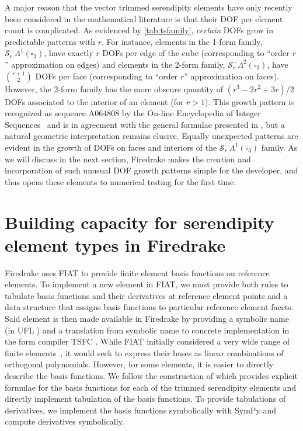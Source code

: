 \documentclass[format=acmsmall,screen,timestamp=false,a4paper]{acmart}
\newcommand{\calS}{\mathcal{S}}
\begin{document}
	
	A major reason that the vector trimmed serendipity elements have only recently been considered in the mathematical literature is that their DOF per element count is complicated.
	As evidenced by \cref{tab:tsfamily}, \textit{certain} DOFs grow in predictable patterns with $r$.
	For instance, elements in the 1-form family, $\calS_r^-\Lambda^1(\square_3)$, have exactly $r$ DOFs per edge of the cube (corresponding to ``order $r$'' approximation on edges) and elements in the 2-form family, $\calS_r^-\Lambda^2(\square_3)$, have ${\displaystyle {r+1}\choose 2}$ DOFs per face (corresponding to ``order $r$'' approximation on faces).
	However, the 2-form family has the more obscure quantity of $(r^3 - 2r^2 + 3r)/2$ DOFs associated to the interior of an element (for $r>1$).
	This growth pattern is recognized as sequence A064808 by the On-line Encyclopedia of Integer Sequences~\cite{OEIS} and is in agreement with the general formulae presented in \citet{gillette2019trimmed}, but a natural geometric interpretation remains elusive.
	Equally unexpected patterns are evident in the growth of DOFs on faces and interiors of the $\calS_r^-\Lambda^1(\square_3)$ family.
	As we will discuss in the next section, Firedrake makes the creation and incorporation of such unusual DOF growth patterns simple for the developer, and thus opens these elements to numerical testing for the first time.
	
  
  \section{Building capacity for serendipity element types in Firedrake}
  \label{sec:buildcap}

  Firedrake uses FIAT \cite{kirby2004algorithm,kirby2012fiat} to provide finite element basis functions on reference elements.  
  To implement a new element in FIAT, we must provide both rules to tabulate basis functions and their derivatives at reference element points and a data structure that assigns basis functions to particular reference element facets.
  Said element is then made available in Firedrake by providing a symbolic name (in UFL \cite{alnaes2014unified}) and a translation from symbolic name to concrete implementation in the form compiler TSFC \cite{homolya2018tsfc}.  While FIAT initially considered a very wide range of finite elements~\cite{kirby2012common}, it would seek to express their bases as linear combinations of orthogonal polynomials.  However, for some elements, it is easier to directly describe the basis functions.
  We follow the construction of \citet{gillette2019computational} which provides explicit formulae for the basis functions for each of the trimmed serendipity elements and directly implement tabulation of the basis functions. To provide tabulations of derivatives, we implement the basis functions symbolically with SymPy \cite{sympy2017} and compute derivatives symbolically.
  
\end{document}
